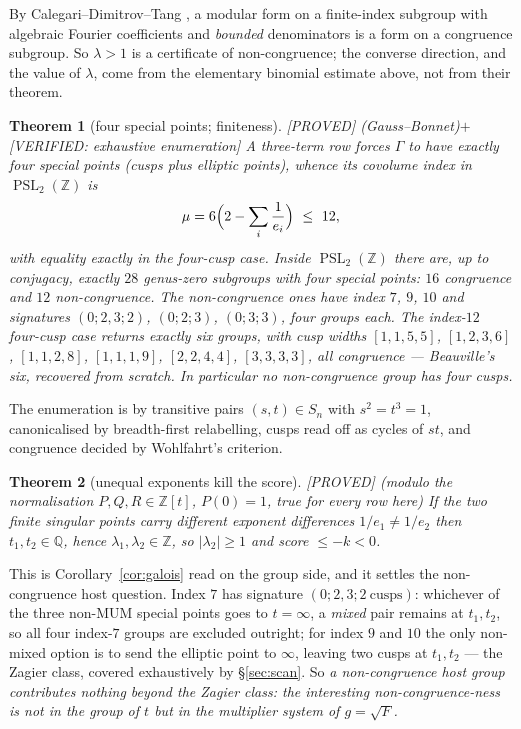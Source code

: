 \documentclass[11pt,reqno]{amsart}
\theoremstyle{plain}
\newtheorem{theorem}{Theorem}[section]
\theoremstyle{definition}
\theoremstyle{remark}
\theoremstyle{plain}
\newcommand{\Z}{\mathbb{Z}}
\newcommand{\Q}{\mathbb{Q}}
\DeclareMathOperator{\PSL}{PSL}
\newcommand{\Proved}{\textup{\textsf{[PROVED]}}}
\newcommand{\VerifiedR}[1]{\textup{\textsf{[VERIFIED: #1]}}}
\begin{document}
By Calegari--Dimitrov--Tang \cite{CDT2021}, a modular form on a finite-index
subgroup with algebraic Fourier coefficients and \emph{bounded} denominators is a
form on a congruence subgroup. So $\lambda>1$ is a certificate of
non-congruence; the converse direction, and the value of $\lambda$, come from the
elementary binomial estimate above, not from their theorem.

\begin{theorem}[four special points; finiteness]\label{thm:N2}
\Proved{} \textup{(}Gauss--Bonnet\textup{)}$+$\VerifiedR{exhaustive enumeration}
A three-term row forces $\Gamma$ to have exactly four special points (cusps plus
elliptic points), whence its covolume index in $\PSL_2(\Z)$ is
\[
\mu=6\Bigl(2-\sum_{i}\frac1{e_i}\Bigr)\ \le\ 12 ,
\]
with equality exactly in the four-cusp case. Inside $\PSL_2(\Z)$ there are, up to
conjugacy, exactly $28$ genus-zero subgroups with four special points: $16$
congruence and $12$ non-congruence. The non-congruence ones have index $7$, $9$,
$10$ and signatures $(0;2,3;2)$, $(0;2;3)$, $(0;3;3)$, four groups each. The
index-$12$ four-cusp case returns exactly six groups, with cusp widths
$[1,1,5,5]$, $[1,2,3,6]$, $[1,1,2,8]$, $[1,1,1,9]$, $[2,2,4,4]$, $[3,3,3,3]$,
\emph{all congruence} --- Beauville's six, recovered from scratch. In particular
no non-congruence group has four cusps.
\end{theorem}

The enumeration is by transitive pairs $(s,t)\in S_n$ with $s^2=t^3=1$,
canonicalised by breadth-first relabelling, cusps read off as cycles of $st$, and
congruence decided by Wohlfahrt's criterion.

\begin{theorem}[unequal exponents kill the score]\label{thm:N3}
\Proved{} \textup{(}modulo the normalisation $P,Q,R\in\Z[t]$, $P(0)=1$, true for
every row here\textup{)} If the two finite singular points carry different
exponent differences $1/e_1\ne1/e_2$ then $t_1,t_2\in\Q$, hence
$\lambda_1,\lambda_2\in\Z$, so $|\lambda_2|\ge1$ and score $\le-k<0$.
\end{theorem}

This is Corollary~\ref{cor:galois} read on the group side, and it settles the
non-congruence host question. Index $7$ has signature
$(0;2,3;2\ \text{cusps})$: whichever of the three non-MUM special points goes to
$t=\infty$, a \emph{mixed} pair remains at $t_1,t_2$, so all four index-$7$
groups are excluded outright; for index $9$ and $10$ the only non-mixed option is
to send the elliptic point to $\infty$, leaving two cusps at $t_1,t_2$ --- the
Zagier class, covered exhaustively by \S\ref{sec:scan}. So \emph{a
non-congruence host group contributes nothing beyond the Zagier class: the
interesting non-congruence-ness is not in the group of $t$ but in the multiplier
system of $g=\sqrt F$.}
\end{document}
